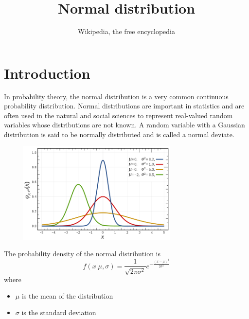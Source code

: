 \documentclass[12pt,a4paper]{article}
\title{Normal distribution}
\author{Wikipedia, the free encyclopedia}
\begin{document}
\maketitle
\section{Introduction}
In probability theory, the normal distribution is a very common continuous probability
distribution. Normal distributions are important in statistics and are often used in the natural
and social sciences to represent real-valued random variables whose distributions are not known.
A random variable with a Gaussian distribution is said to be normally distributed and is called a
normal deviate.

\begin{figure}[h]
  \centering
  \includegraphics[width=8cm]{normal-distribution.png}
\end{figure}

The probability density of the normal distribution is
\begin{equation}
  f(x|\mu,\sigma)
  = \frac{1}{\sqrt{2\pi\sigma^2}}
    e^{-\frac{(x-\mu)^2}{2\sigma^2}}
\end{equation}
where
\begin{itemize}
  \item $\mu$ is the mean of the distribution
  \item $\sigma$ is the standard deviation
\end{itemize}
\end{document}
